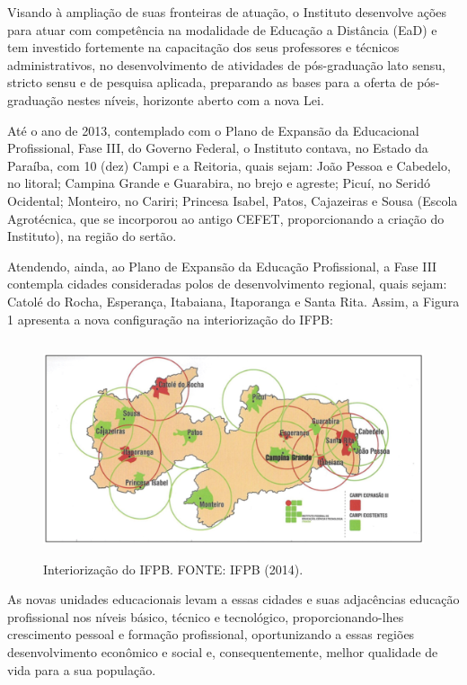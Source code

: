 	Visando à ampliação de suas fronteiras de atuação, o Instituto desenvolve ações para atuar com competência na modalidade de Educação a Distância (EaD) e tem investido fortemente na capacitação dos seus professores e técnicos administrativos, no desenvolvimento de atividades de pós-graduação lato sensu, stricto sensu e de pesquisa aplicada, preparando as bases para a oferta de pós-graduação nestes níveis, horizonte aberto com a nova Lei.
	
	Até o ano de 2013, contemplado com o Plano de Expansão da Educacional Profissional, Fase III, do Governo Federal, o Instituto contava, no Estado da Paraíba, com 10 (dez) Campi e a Reitoria, quais sejam: João Pessoa e Cabedelo, no litoral; Campina Grande e Guarabira, no brejo e agreste; Picuí, no Seridó Ocidental; Monteiro, no Cariri; Princesa Isabel, Patos, Cajazeiras e Sousa (Escola Agrotécnica, que se incorporou ao antigo CEFET, proporcionando a criação do Instituto), na região do sertão. 
	
	Atendendo, ainda, ao Plano de Expansão da Educação Profissional, a Fase III contempla cidades consideradas polos de desenvolvimento regional, quais sejam: Catolé do Rocha, Esperança, Itabaiana, Itaporanga e Santa Rita. Assim, a Figura 1 apresenta a nova configuração na interiorização do IFPB:
	
\begin{figure}
  \centering
  \includegraphics[height=2.5in]{imagens/campiIFPB1CG.png}
  \caption {Interiorização do IFPB. FONTE: IFPB (2014).}
  \label{fig:IFPB1}
\end{figure}

	As novas unidades educacionais levam a essas cidades e suas adjacências educação profissional nos níveis básico, técnico e tecnológico, proporcionando-lhes crescimento pessoal e formação profissional, oportunizando a essas regiões desenvolvimento econômico e social e, consequentemente, melhor qualidade de vida para a sua população.
	
